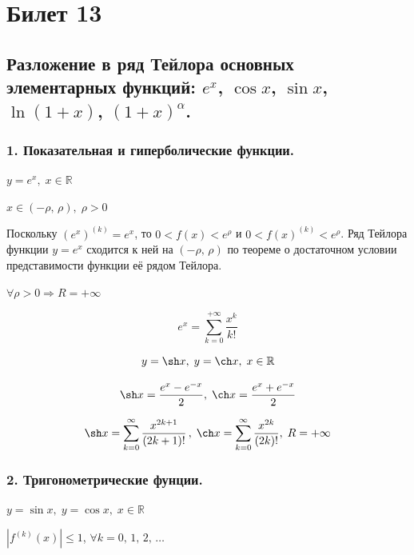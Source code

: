 \documentclass[a4paper,12pt]{article} %
\newcommand{\ryad}{\sum\limits^{\infty}_{k = 0}}
\renewcommand {\le}{\leqslant}
\begin{document}


\section{Билет 13}
\subsection{Разложение в ряд Тейлора основных элементарных функций: $e^x$, $\cos x$, $\sin x$, $\ln (1 + x)$, $(1 + x)^{\alpha}$.}


\subsubsection*{1. Показательная и гиперболические функции.}


\begin{center}
$y = e^x, \; x \in \mathbb{R}$
\vspace{8pt}

$x \in (-\rho, \, \rho), \; \rho > 0$
\end{center}

Поскольку $(e^x)^{(k)} = e^x $, то $0 < f(x) < e^{\rho}$ и $0 < f(x)^{(k)} < e^{\rho}$. Ряд Тейлора функции $y = e^x$ сходится к ней на $( - \rho, \, \rho)$ по теореме о достаточном условии представимости функции её рядом Тейлора.

$\forall \rho > 0 \Rightarrow R = + \infty$

\[ e^x = \sum\limits^{+\infty}_{k = 0} \frac{x^k}{k!}\]

\[y = \sh x, \; y = \ch x, \; x \in \mathbb{R} \]

\[ \sh x = \frac{e^x - e^{-x}}{2}, \; \ch x = \frac{e^x + e^{-x}}{2} \]

\[ \sh x = \ryad \frac{x^{2k + 1}}{(2k + 1)!} \,, \; \ch x = \ryad \frac{x^{2k}}{(2k)!}, \; R = +\infty\]


\subsubsection*{2. Тригонометрические фунции.}

\begin{center}
$y = \sin x, \; y = \cos x, \; x \in \mathbb{R}$
\vspace{8pt}

$| f^{(k)} (x) | \le 1$, $\forall k = 0, \, 1, \, 2, \, \ldots$
\end{center}
 
\end{document}
